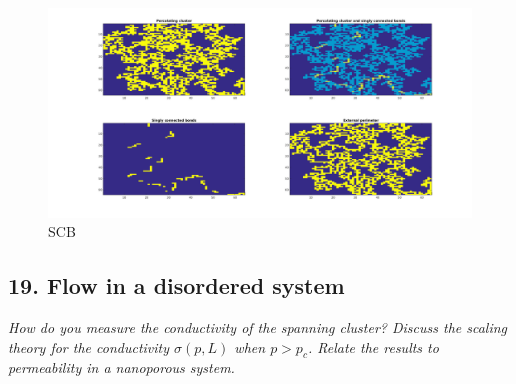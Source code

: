 \documentclass[english, a4paper]{article}
\begin{document}
\begin{figure}[H]
  \begin{center}
  \includegraphics[width = 140mm]{../Figures/singlyConnectedBonds.png}
  \caption{SCB}
  \label{fig:fig11}
  \end{center}
\end{figure}


\subsection{ 19. Flow in a disordered system}
\textit{How do you measure the conductivity of the spanning cluster? Discuss the scaling theory
for the conductivity $\sigma(p,L)$ when $p > p_c$. Relate the results to permeability in a nanoporous
system.} \\
\end{document}
